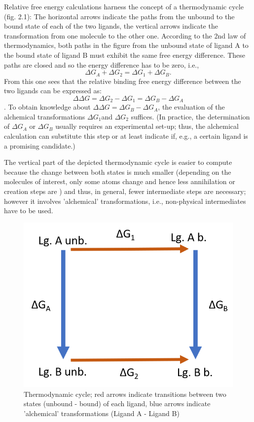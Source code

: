 Relative free energy calculations harness the concept of a thermodynamic
cycle \cite{Kollman.}(fig. 2.1): The horizontal arrows indicate the
paths from the unbound to the bound state of each of the two ligands,
the vertical arrows indicate the transformation from one molecule
to the other one. According to the 2nd law of thermodynamics, both paths
in the figure from the unbound state of ligand A to the bound state
of ligand B must exhibit the same free energy difference. These paths
are closed and so the energy difference has to be zero, i.e., 
\[
\Delta G_{A}+\Delta G_{2}=\Delta G_{1}+\Delta G_{B}.
\]
From this one sees that the relative binding free energy difference between the two ligands can be expressed as:
\[
\Delta\Delta G=\Delta G_{2}-\Delta G_{1}=\Delta G_{B}-\Delta G_{A}
\]
\cite{Cournia.2017}. To obtain knowledge about $\Delta\Delta G=\Delta G_{B}-\Delta G_{A}$,
the evaluation of the alchemical transformations $\Delta G_{1}$and
$\Delta G_{2}$ suffices. (In practice, the determination
of $\Delta G_{A}$ or $\Delta G_{B}$ usually requires an experimental
set-up; thus, the alchemical calculation can substitute this step
or at least indicate if, e.g., a certain ligand is a promising candidate.)

The vertical part of the depicted thermodynamic cycle is easier 
to compute because the change between both states is much smaller
(depending on the molecules of interest, only some atoms change and hence less annihilation or creation steps are ) and thus, in general, fewer intermediate steps
are necessary; however it involves 'alchemical' transformations, i.e.,
non-physical intermediates have to be used. 
\begin{figure}
\includegraphics[scale=0.8]{cycle1}\caption{Thermodynamic cycle; red arrows indicate transitions between two states
(unbound - bound) of each ligand, blue arrows indicate 'alchemical'
transformations (Ligand A - Ligand B)}

\end{figure}

